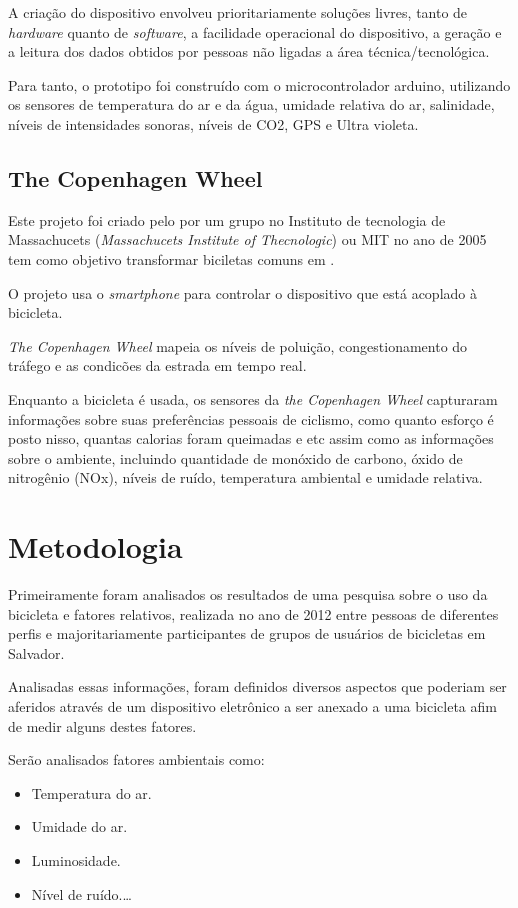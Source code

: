 \documentclass[final,12pt, times, 5p, twocolumn]{elsarticle}
\begin{document}
A criação do dispositivo envolveu prioritariamente soluções livres, tanto de \textit{hardware} quanto de \textit{software}, a facilidade operacional do dispositivo, a geração e a leitura dos dados obtidos por pessoas não ligadas a área técnica/tecnológica.

Para tanto, o prototipo foi construído com o microcontrolador arduino, utilizando os sensores de temperatura do ar e da água, umidade relativa do ar, salinidade, níveis de intensidades sonoras, níveis de CO2, GPS e Ultra violeta.

\subsection{The Copenhagen Wheel}
Este projeto foi criado pelo por um grupo no Instituto de tecnologia de Massachucets (\textit{Massachucets Institute of Thecnologic}) ou MIT no ano de 2005 tem como objetivo transformar biciletas comuns em \cite{e-bikes}.

O projeto usa o \textit{smartphone} para controlar o dispositivo que está acoplado à bicicleta.

\textit{The Copenhagen Wheel} mapeia os níveis de poluição, congestionamento do tráfego e as condicões da estrada em tempo real. 

Enquanto a bicicleta é usada, os sensores da \textit{the Copenhagen Wheel} capturaram informações sobre suas preferências pessoais de ciclismo, como quanto esforço é posto nisso, quantas calorias foram queimadas e etc assim como as informações sobre o ambiente, incluindo quantidade de monóxido de carbono, óxido de nitrogênio (NOx), níveis de ruído, temperatura ambiental e umidade relativa.

\section{Metodologia}
Primeiramente foram analisados os resultados de uma pesquisa sobre o uso da bicicleta  e fatores relativos, realizada no ano de 2012 entre pessoas de diferentes perfis e majoritariamente participantes de grupos de usuários de bicicletas em Salvador.

Analisadas essas informações, foram definidos diversos aspectos que poderiam ser aferidos através de um dispositivo eletrônico a ser anexado a uma bicicleta afim de medir alguns destes fatores.

Serão analisados fatores ambientais como:

\begin{itemize}

  \item Temperatura do ar.
  \item Umidade do ar.
  \item Luminosidade.
  \item Nível de ruído.\ldots

\end{itemize}
\end{document}
